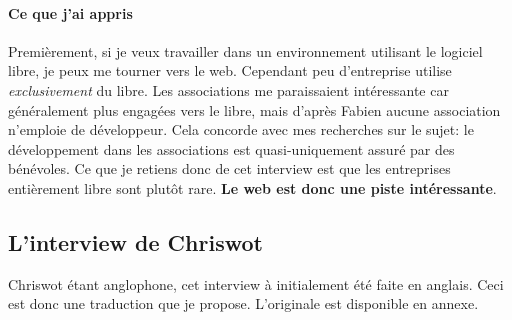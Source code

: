\documentclass[a4paper,12pt, draft]{report}
\begin{document}
\paragraph{Ce que j'ai appris}
Premièrement, si je veux travailler dans un environnement utilisant le logiciel libre, je peux me tourner vers le web. Cependant peu d'entreprise utilise \textit{exclusivement} du libre. Les associations me paraissaient intéressante car généralement plus engagées vers le libre, mais d'après Fabien aucune association n'emploie de développeur. Cela concorde avec mes recherches sur le sujet: le développement dans les associations est quasi-uniquement assuré par des bénévoles.
Ce que je retiens donc de cet interview est que les entreprises entièrement libre sont plutôt rare. \textbf{Le web est donc une piste intéressante}.


\subsection{L'interview de Chriswot}
Chriswot étant anglophone, cet interview à initialement été faite en anglais. Ceci est donc une traduction que je propose. L'originale est disponible en annexe.
\end{document}
